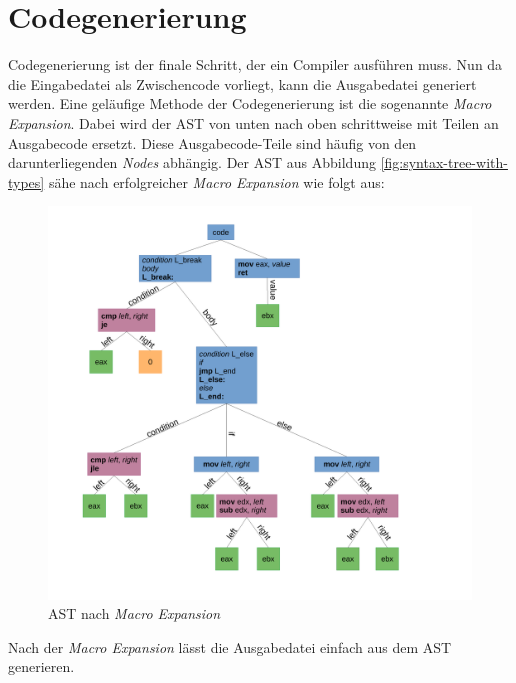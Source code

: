 \section{Codegenerierung} \label{sec:traditional_code_generation}
Codegenerierung ist der finale Schritt, der ein Compiler ausführen muss.
Nun da die Eingabedatei als Zwischencode vorliegt, kann die Ausgabedatei generiert werden. Eine geläufige Methode der Codegenerierung ist die sogenannte \textit{Macro Expansion}.
Dabei wird der AST von unten nach oben schrittweise mit Teilen an Ausgabecode ersetzt.
Diese Ausgabecode-Teile sind häufig von den darunterliegenden \textit{Nodes} abhängig. Der AST aus Abbildung \ref{fig:syntax-tree-with-types} sähe nach erfolgreicher \textit{Macro Expansion} wie folgt aus:

\begin{figure}[H]
    \centering
    \includegraphics[scale=0.4]{resources/images/AST_macro_expansion.pdf}
    \caption[AST nach \textit{Macro Expansion}. (Basierend auf Abbildung \ref{fig:syntax-tree})]{AST nach \textit{Macro Expansion}}
    \label{fig:syntax-tree-after-macro-expansion}
\end{figure}

Nach der \textit{Macro Expansion} lässt die Ausgabedatei einfach aus dem AST generieren.

